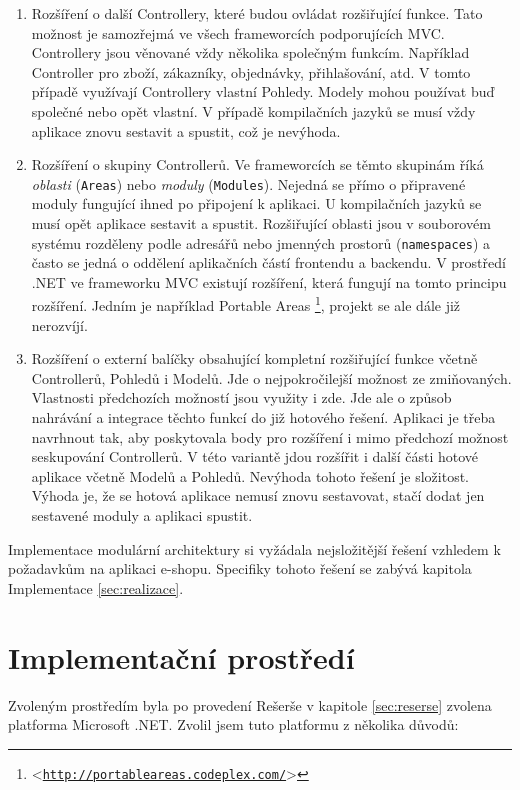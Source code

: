 \documentclass[11pt,twoside,a4paper]{book}
\let\oldUrl\url
\renewcommand\url[1]{<\texttt{\oldUrl{#1}}>}
\begin{document}
\begin{enumerate}
\item Rozšíření o další Controllery, které budou ovládat rozšiřující funkce. Tato možnost je samozřejmá ve všech frameworcích podporujících MVC. Controllery jsou věnované vždy několika společným funkcím. Například Controller pro zboží, zákazníky, objednávky, přihlašování, atd. V tomto případě využívají Controllery vlastní Pohledy. Modely mohou používat buď společné nebo opět vlastní. V případě kompilačních jazyků se musí vždy aplikace znovu sestavit a spustit, což je nevýhoda.

\item Rozšíření o skupiny Controllerů. Ve frameworcích se těmto skupinám říká \textit{oblasti} (\texttt{Areas}) nebo \textit{moduly} (\texttt{Modules}). Nejedná se přímo o připravené moduly fungující ihned po připojení k aplikaci. U kompilačních jazyků se musí opět aplikace sestavit a spustit. Rozšiřující oblasti jsou v souborovém systému rozděleny podle adresářů nebo jmenných prostorů (\texttt{namespaces}) a často se jedná o oddělení aplikačních částí frontendu a backendu. V prostředí .NET ve frameworku MVC existují rozšíření, která fungují na tomto principu rozšíření. Jedním je například Portable Areas \footnote{\url{http://portableareas.codeplex.com/}}, projekt se ale dále již nerozvíjí.

\item Rozšíření o externí balíčky obsahující kompletní rozšiřující funkce včetně Controllerů, Pohledů i Modelů. Jde o nejpokročilejší možnost ze zmiňovaných. Vlastnosti předchozích možností jsou využity i zde. Jde ale o způsob nahrávání a integrace těchto funkcí do již hotového řešení. Aplikaci je třeba navrhnout tak, aby poskytovala body pro rozšíření i mimo předchozí možnost seskupování Controllerů. V této variantě jdou rozšířit i další části hotové aplikace včetně Modelů a Pohledů. Nevýhoda tohoto řešení je složitost. Výhoda je, že se hotová aplikace nemusí znovu sestavovat, stačí dodat jen sestavené moduly a aplikaci spustit.
\end{enumerate}


Implementace modulární architektury si vyžádala nejsložitější řešení vzhledem k požadavkům na aplikaci e-shopu. Specifiky tohoto řešení se zabývá kapitola Implementace \ref{sec:realizace}.


\section{Implementační prostředí}
\label{implprost}
Zvoleným prostředím byla po provedení  Rešerše v kapitole \ref{sec:reserse} zvolena platforma Microsoft .NET. Zvolil jsem tuto platformu z několika důvodů:
\end{document}
